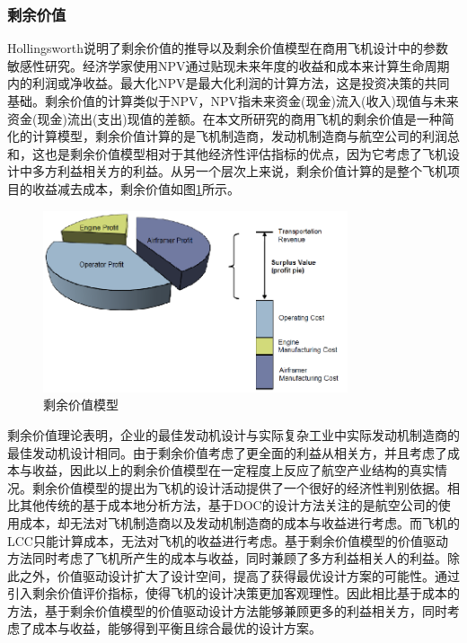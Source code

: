 \documentclass[12pt,a4paper]{report}
\begin{document}
\subsubsection{剩余价值}
Hollingsworth说明了剩余价值的推导以及剩余价值模型在商用飞机设计中的参数敏感性研究\cite{hollingsworth2011an}。经济学家使用NPV通过贴现未来年度的收益和成本来计算生命周期内的利润或净收益。最大化NPV是最大化利润的计算方法，这是投资决策的共同基础。剩余价值的计算类似于NPV，NPV指未来资金(现金)流入(收入)现值与未来资金(现金)流出(支出)现值的差额。在本文所研究的商用飞机的剩余价值是一种简化的计算模型，剩余价值计算的是飞机制造商，发动机制造商与航空公司的利润总和\cite{collopy1997surplus}，这也是剩余价值模型相对于其他经济性评估指标的优点，因为它考虑了飞机设计中多方利益相关方的利益。从另一个层次上来说，剩余价值计算的是整个飞机项目的收益减去成本，剩余价值如图\ref{fig:g33svmodel}所示。



\begin{figure}[H]
	\centering
		\includegraphics[width=0.8\textwidth]{./media3/image3.png}
		\caption{剩余价值模型}
		\label{fig:g33svmodel}
\end{figure}

剩余价值理论表明，企业的最佳发动机设计与实际复杂工业中实际发动机制造商的最佳发动机设计相同\cite{collopy1997surplus}。由于剩余价值考虑了更全面的利益从相关方，并且考虑了成本与收益，因此以上的剩余价值模型在一定程度上反应了航空产业结构的真实情况。剩余价值模型的提出为飞机的设计活动提供了一个很好的经济性判别依据。相比其他传统的基于成本地分析方法，基于DOC的设计方法关注的是航空公司的使用成本，却无法对飞机制造商以及发动机制造商的成本与收益进行考虑。而飞机的LCC只能计算成本，无法对飞机的收益进行考虑。基于剩余价值模型的价值驱动方法同时考虑了飞机所产生的成本与收益，同时兼顾了多方利益相关人的利益。除此之外，价值驱动设计扩大了设计空间，提高了获得最优设计方案的可能性。通过引入剩余价值评价指标，使得飞机的设计决策更加客观理性。因此相比基于成本的方法，基于剩余价值模型的价值驱动设计方法能够兼顾更多的利益相关方，同时考虑了成本与收益，能够得到平衡且综合最优的设计方案。
\end{document}
